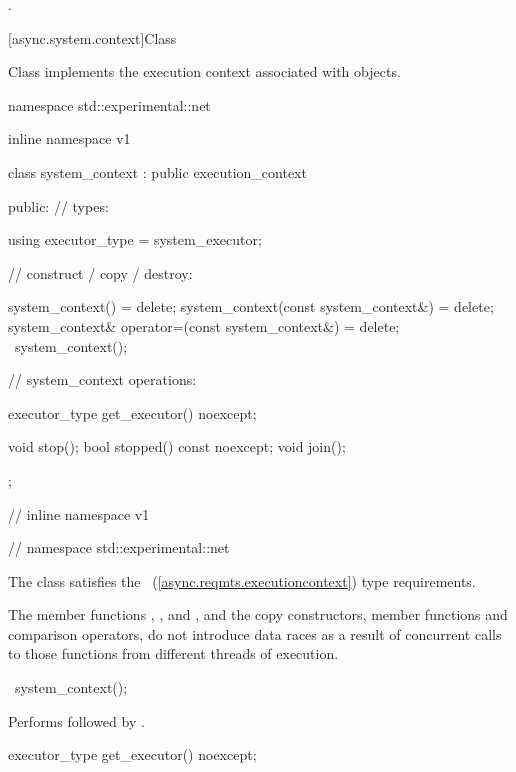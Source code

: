 \begin{itemdescr}
\pnum
\returns {}.
\end{itemdescr}




[async.system.context]{Class }

%
\pnum
Class  implements the execution context associated with  objects.

\begin{codeblock}
namespace std::experimental::net {
inline namespace v1 {

  class system_context : public execution_context
  {
  public:
    // types:

    using executor_type = system_executor;

    // construct / copy / destroy:

    system_context() = delete;
    system_context(const system_context&) = delete;
    system_context& operator=(const system_context&) = delete;
    ~system_context();

    // system_context operations:

    executor_type get_executor() noexcept;

    void stop();
    bool stopped() const noexcept;
    void join();
  };

} // inline namespace v1
} // namespace std::experimental::net
\end{codeblock}

\pnum
The class  satisfies the ~(\ref{async.reqmts.executioncontext}) type requirements.

\pnum
The  member functions , , and , and the  copy constructors, member functions and comparison operators, do not introduce data races as a result of concurrent calls to those functions from different threads of execution.

%
\begin{itemdecl}
~system_context();
\end{itemdecl}

\begin{itemdescr}
\pnum
\effects Performs  followed by .
\end{itemdescr}

%
\begin{itemdecl}
executor_type get_executor() noexcept;
\end{itemdecl}

